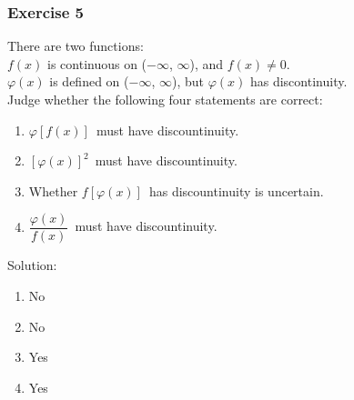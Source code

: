 \begin{frame}
    \frametitle{Exercise 5}
    There are two functions:\\
    $f(x)$ is continuous on ($-\infty$, $\infty$), and $f(x) \neq 0$.\\
    $\varphi (x)$ is defined on ($-\infty$, $\infty$), but $\varphi (x)$ has discontinuity.\\
    \bigskip
    Judge whether the following four statements are correct:
    \begin{enumerate}
        \item $\varphi [f(x)]$\ must have discountinuity.
        \item $[\varphi (x)]^{2}$\ must have discountinuity.
        \item Whether $f[\varphi (x)]$\ has discountinuity is uncertain.
        \item $\dfrac{\varphi (x)}{f(x)}$\ must have discountinuity.
    \end{enumerate}

    Solution:

    \begin{enumerate}
        \item No
        \item No
        \item Yes
        \item Yes
    \end{enumerate}
\end{frame}


